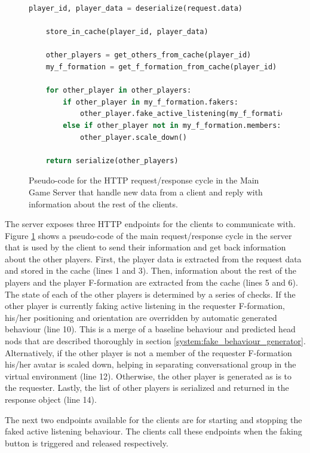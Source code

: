 \documentclass[]{simple-thesis}
\begin{document}
\begin{figure}
  \begin{lstlisting}[language=Python]
    player_id, player_data = deserialize(request.data)

    store_in_cache(player_id, player_data)

    other_players = get_others_from_cache(player_id)
    my_f_formation = get_f_formation_from_cache(player_id)

    for other_player in other_players:
        if other_player in my_f_formation.fakers:
            other_player.fake_active_listening(my_f_formation.speaker)
        else if other_player not in my_f_formation.members:
            other_player.scale_down()
           
    return serialize(other_players)
  \end{lstlisting}
  \caption{Pseudo-code for the HTTP request/response cycle in the Main Game Server that handle new data from a client and reply with information about the rest of the clients.}
  \label{fig:system:main_server_pseudocode}
\end{figure}

The server exposes three HTTP endpoints for the clients to communicate with.
Figure \ref{fig:system:main_server_pseudocode} shows a pseudo-code of the main request/response cycle in the server that is used by the client to send their information and get back information about the other players.
First, the player data is extracted from the request data and stored in the cache (lines 1 and 3).
Then, information about the rest of the players and the player F-formation are extracted from the cache (lines 5 and 6).
The state of each of the other players is determined by a series of checks.
If the other player is currently faking active listening in the requester F-formation, his/her positioning and orientation are overridden by automatic generated behaviour (line 10).
This is a merge of a baseline behaviour and predicted head nods that are described thoroughly in section \ref{system:fake_behaviour_generator}.
Alternatively, if the other player is not a member of the requester F-formation his/her avatar is scaled down, helping in separating conversational group in the virtual environment (line 12).
Otherwise, the other player is generated as is to the requester.
Lastly, the list of other players is serialized and returned in the response object (line 14).

The next two endpoints available for the clients are for starting and stopping the faked active listening behaviour.
The clients call these endpoints when the faking button is triggered and released respectively.
\end{document}
